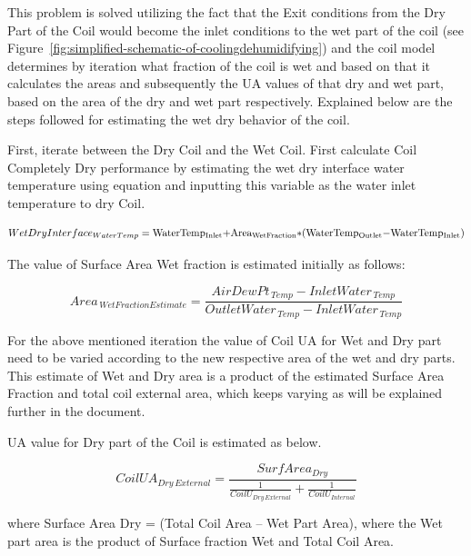 This problem is solved utilizing the fact that the Exit conditions from the Dry Part of the Coil would become the inlet conditions to the wet part of the coil (see Figure~\ref{fig:simplified-schematic-of-coolingdehumidifying}) and the coil model determines by iteration what fraction of the coil is wet and based on that it calculates the areas and subsequently the UA values of that dry and wet part, based on the area of the dry and wet part respectively. Explained below are the steps followed for estimating the wet dry behavior of the coil.

First, iterate between the Dry Coil and the Wet Coil. First calculate Coil Completely Dry performance by estimating the wet dry interface water temperature using equation and inputting this variable as the water inlet temperature to dry Coil.

\begin{equation}
  WetDryInterfac{e_{WaterTemp}} = {\rm{WaterTem}}{{\rm{p}}_{{\rm{Inlet}}}}{\rm{ + Are}}{{\rm{a}}_{{\rm{WetFraction}}}}{\rm{*(WaterTem}}{{\rm{p}}_{{\rm{Outlet}}}}{\rm{ - WaterTem}}{{\rm{p}}_{{\rm{Inlet}}}}{\rm{)}}
\end{equation}

The value of Surface Area Wet fraction is estimated initially as follows:

\begin{equation}
Are{a_{\,WetFractionEstimate}} = \frac{{AirDewP{t_{\,Temp}} - InletWate{r_{\,Temp}}}}{{OutletWate{r_{\,Temp}} - InletWate{r_{\,Temp}}}}
\label{eq:AreaWetFractionEstimate}
\end{equation}

For the above mentioned iteration the value of Coil UA for Wet and Dry part need to be varied according to the new respective area of the wet and dry parts. This estimate of Wet and Dry area is a product of the estimated Surface Area Fraction and total coil external area, which keeps varying as will be explained further in the document.

UA value for Dry part of the Coil is estimated as below.

\begin{equation}
CoilU{A_{Dry\,External}} = \frac{{SurfAre{a_{Dry}}}}{{\frac{1}{{Coil{U_{Dry\,External}}}} + \frac{1}{{Coil{U_{Internal}}}}}}
\end{equation}

where Surface Area Dry = (Total Coil Area -- Wet Part Area), where the Wet part area is the product of Surface fraction Wet and Total Coil Area.

